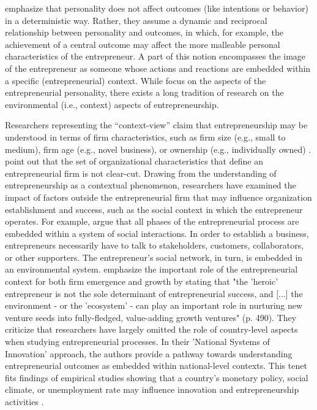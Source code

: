 \documentclass[a4paper,man,noextraspace,natbib]{apa6}
\begin{document}
\cite{Obschonka2017} emphasize that personality does not affect outcomes (like intentions or behavior) in a deterministic way. 
Rather, they assume a dynamic and reciprocal relationship between personality and outcomes, in which, for example, the achievement of a central outcome may affect the more malleable personal characteristics of the entrepreneur. 
A part of this notion encompasses the image of the entrepreneur as someone whose actions and reactions are embedded within a specific (entrepreneurial) context. 
While \cite{Obschonka2017} focus on the aspects of the entrepreneurial personality, there exists a long tradition of research on the environmental (i.e., context) aspects of entrepreneurship. \par

Researchers representing the ``context-view'' claim that entrepreneurship may be understood in terms of firm characteristics, such as firm size (e.g., small to medium), firm age (e.g., novel business), or ownership (e.g., individually owned) \citep{Audretsch2012}. 
\cite{Audretsch2012} point out that the set of organizational characteristics that define an entrepreneurial firm is not clear-cut. 
Drawing from the understanding of entrepreneurship as a contextual phenomenon, researchers have examined the impact of factors outside the entrepreneurial firm that may influence organization establishment and success, such as the social context in which the entrepreneur operates.  
For example, \cite{Acs2006} argue that all phases of the entrepreneurial process are embedded within a system of social interactions. 
In order to establish a business, entrepreneurs necessarily have to talk to stakeholders, customers, collaborators, or other supporters. 
The entrepreneur's social network, in turn, is embedded in an environmental system. 
\cite{Acs2014} emphasize the important role of the entrepreneurial context for both firm emergence and growth by stating that "the 'heroic' entrepreneur is not the sole determinant of entrepreneurial success, and [...] the environment - or the 'ecosystem' - can play an important role in nurturing new venture seeds into fully-fledged, value-adding growth ventures" (p. 490). 
They criticize that researchers have largely omitted the role of country-level aspects when studying entrepreneurial processes. 
In their 'National Systems of Innovation' approach, the authors provide a pathway towards understanding entrepreneurial outcomes as embedded within national-level contexts. 
This tenet fits findings of empirical studies showing that a country's monetary policy, social climate, or unemployment rate may influence innovation and entrepreneurship activities \cite[e.g.][]{Galindo2014, Marcotte2013, Spencer2004}. \par
\end{document}
